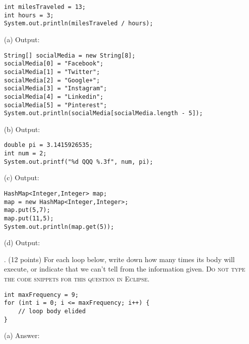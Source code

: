 \documentclass[12pt,twoside]{article}
\newcommand{\fillInBlank}[1][0.5in]{\underline{\hspace{#1}}}
\begin{document}
\hfill
\begin{minipage}{0.60\linewidth}
\begin{lstlisting}
int milesTraveled = 13;
int hours = 3;
System.out.println(milesTraveled / hours);
\end{lstlisting}
\end{minipage}
\hspace{0.25in}
(a) Output: \fillInBlank[1in]

\vfill
\hfill
\begin{minipage}{0.60\linewidth}
\begin{lstlisting}
String[] socialMedia = new String[8];
socialMedia[0] = "Facebook";
socialMedia[1] = "Twitter";
socialMedia[2] = "Google+";
socialMedia[3] = "Instagram";
socialMedia[4] = "Linkedin";
socialMedia[5] = "Pinterest";
System.out.println(socialMedia[socialMedia.length - 5]);
\end{lstlisting}
\end{minipage}
\hspace{0.25in}
(b) Output: \fillInBlank[1in]

\vfill
\hfill
\begin{minipage}{0.60\linewidth}
\begin{lstlisting}
double pi = 3.1415926535;
int num = 2;
System.out.printf("%d QQQ %.3f", num, pi);
\end{lstlisting}
\end{minipage}
\hspace{0.25in}
(c) Output: \fillInBlank[1in]

\vfill

\hfill
\begin{minipage}{0.60\linewidth}
\begin{lstlisting}
HashMap<Integer,Integer> map;
map = new HashMap<Integer,Integer>;
map.put(5,7);
map.put(11,5);
System.out.println(map.get(5));
\end{lstlisting}
\end{minipage}
\hspace{0.25in}
(d) Output: \fillInBlank[1in]
\vfill


. (12 points) For each loop below, write down how many times its body will execute, or indicate that we can't tell from the information given. \textsc{Do not type the code snippets for this question in Eclipse}.

\hfill
\begin{minipage}{0.58\linewidth}
\begin{lstlisting}
int maxFrequency = 9;
for (int i = 0; i <= maxFrequency; i++) {
	// loop body elided
}
\end{lstlisting}
\end{minipage}
\hspace{0.25in}
\begin{minipage}[t]{0.25\linewidth}
(a) Answer: \fillInBlank
\end{minipage}
\vfill
\end{document}
